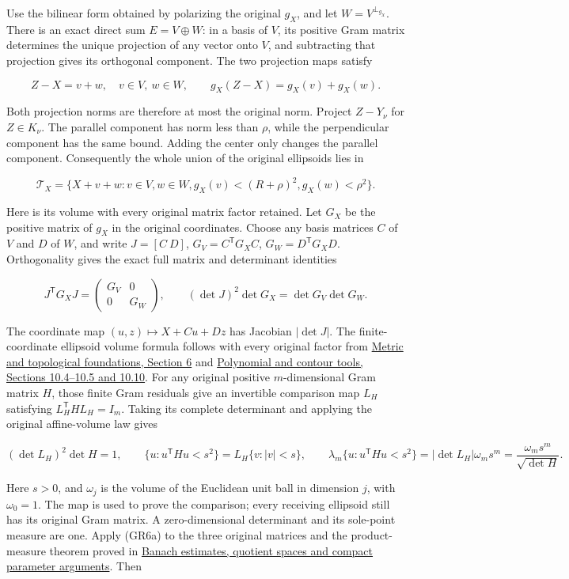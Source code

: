 \documentclass[
  11pt,
]{article}
\begin{document}
Use the bilinear form obtained by polarizing the original \(g_X\), and
let \(W=V^{\perp_{g_X}}\). There is an exact direct sum \(E=V\oplus W\):
in a basis of \(V\), its positive Gram matrix determines the unique
projection of any vector onto \(V\), and subtracting that projection
gives its orthogonal component. The two projection maps satisfy

\[
Z-X=v+w,\quad v\in V,\ w\in W,
\qquad g_X(Z-X)=g_X(v)+g_X(w).
\tag{GR3}
\]

Both projection norms are therefore at most the original norm. Project
\(Z-Y_\nu\) for \(Z\in K_\nu\). The parallel component has norm less
than \(\rho\), while the perpendicular component has the same bound.
Adding the center only changes the parallel component. Consequently the
whole union of the original ellipsoids lies in

\[
\mathcal T_X=\{X+v+w:v\in V, w\in W,
g_X(v)<(R+\rho)^2, g_X(w)<\rho^2\}.
\tag{GR4}
\]

Here is its volume with every original matrix factor retained. Let
\(G_X\) be the positive matrix of \(g_X\) in the original coordinates.
Choose any basis matrices \(C\) of \(V\) and \(D\) of \(W\), and write
\(J=[C\ D]\), \(G_V=C^{\mathsf T}G_XC\), \(G_W=D^{\mathsf T}G_XD\).
Orthogonality gives the exact full matrix and determinant identities

\[
J^{\mathsf T}G_XJ=
\begin{pmatrix}G_V&0\\0&G_W\end{pmatrix},
\qquad
(\det J)^2\det G_X=\det G_V\det G_W.
\tag{GR5}
\]

The coordinate map \((u,z)\mapsto X+Cu+Dz\) has Jacobian \(|\det J|\).
The finite-coordinate ellipsoid volume formula follows with every
original factor from
\href{metric-foundation-bridges.pdf\#section*.7}{Metric
and topological foundations, Section 6} and
\href{stable-prerequisite-bridges.pdf}{Polynomial and contour tools,
Sections 10.4--10.5 and 10.10}. For any original positive
\(m\)-dimensional Gram matrix \(H\), those finite Gram residuals give an
invertible comparison map \(L_H\) satisfying
\(L_H^{\mathsf T}HL_H=I_m\). Taking its complete determinant and
applying the original affine-volume law gives

{\fontsize{8.5}{10}\selectfont
\[
(\det L_H)^2\det H=1,\qquad
\{u:u^{\mathsf T}Hu<s^2\}=L_H\{v:|v|<s\},\qquad
\lambda_m\{u:u^{\mathsf T}Hu<s^2\}
=|\det L_H|\omega_m s^m
=\frac{\omega_m s^m}{\sqrt{\det H}}.
\tag{GR6a}
\]
}

Here \(s>0\), and \(\omega_j\) is the volume of the Euclidean unit ball
in dimension \(j\), with \(\omega_0=1\). The map is used to prove the
comparison; every receiving ellipsoid still has its original Gram
matrix. A zero-dimensional determinant and its sole-point measure are
one. Apply (GR6a) to the three original matrices and the product-measure
theorem proved in \href{banach-foundation-bridges.pdf}{Banach estimates,
quotient spaces and compact parameter arguments}. Then
\end{document}
